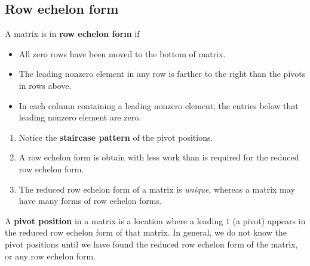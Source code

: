 \documentclass[aima104_lecturenotes_ku.tex]{subfiles}
\begin{document}
\subsection{Row echelon form}
\begin{mdframed}[style=myframe]
        A matrix is in \textbf{row echelon form} if
        \begin{itemize}
            \item All zero rows have been moved to the bottom of matrix.
            \item The leading nonzero element in any row is farther to the right than the pivots in rows above.
            \item In each column containing a leading nonzero element, the entries below that leading nonzero element are zero.
        \end{itemize}
\end{mdframed}

\begin{enumerate}
    \item Notice the \textbf{staircase pattern} of the pivot positions.
    \item A row echelon form is obtain with less work than is required for the reduced row echelon form.
    \item The reduced row echelon form of a matrix is \textit{unique}, whereas a matrix may have many forms of row echelon forms.
\end{enumerate}
\begin{definition}
    A \textbf{pivot position} in a matrix is a location where a leading $1$ (a pivot) appears in the reduced row echelon form of that matrix. In general, we do not know the pivot positions until we have found the reduced row echelon form of the matrix, or any row echelon form.
\end{definition}
\end{document}
